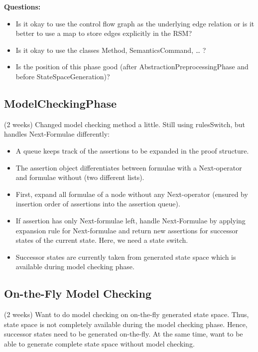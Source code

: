 \documentclass[a4paper,12pt]{article}
\begin{document}
\textbf{Questions:}
\begin{itemize}
	\item Is it okay to use the control flow graph as the underlying edge relation or is it better to use a map to store edges explicitly in the RSM?
	\item Is it okay to use the classes Method, SemanticsCommand, … ?
	\item Is the position of this phase good (after AbstractionPreprocessingPhase and before StateSpaceGeneration)?
\end{itemize} 


\subsection{ModelCheckingPhase}
(2 weeks)
Changed model checking method a little. Still using rulesSwitch, but handles Next-Formulae differently:
\begin{itemize}
	\item	A queue keeps track of the assertions to be expanded in the proof structure.
	\item	The assertion object differentiates between formulae with a Next-operator and formulae without (two different lists).
	\item	First, expand all formulae of a node without any Next-operator (ensured by insertion order of assertions into the assertion queue).
	\item	If assertion has only Next-formulae left, handle Next-Formulae by applying expansion rule for Next-formulae and return new assertions for successor states of the current state. Here, we need a state switch.
	\item	Successor states are currently taken from generated state space which is available during model checking phase.
\end{itemize}


\subsection{On-the-Fly Model Checking}							(2 weeks)
Want to do model checking on on-the-fly generated state space. Thus, state space is not completely available during the model checking phase. Hence, successor states need to be generated on-the-fly. At the same time, want to be able to generate complete state space without model checking.\\
\end{document}
